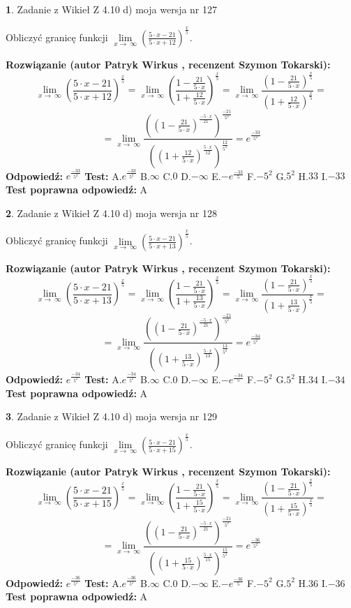 \documentclass[12pt, a4paper]{article}
\theoremstyle{definition} %
\newtheorem{zad}{}
\newcommand{\zadStart}[1]{\begin{zad}#1\newline}
\newcommand{\zadStop}{\end{zad}}
\newcommand{\rozwStart}[2]{\noindent \textbf{Rozwiązanie (autor #1 , recenzent #2): }\newline}
\newcommand{\rozwStop}{\newline}
\newcommand{\odpStart}{\noindent \textbf{Odpowiedź:}\newline}
\newcommand{\odpStop}{\newline}
\newcommand{\testStart}{\noindent \textbf{Test:}\newline}
\newcommand{\testStop}{\newline}
\newcommand{\kluczStart}{\noindent \textbf{Test poprawna odpowiedź:}\newline}
\newcommand{\kluczStop}{\newline}
\begin{document}
\zadStart{Zadanie z Wikieł Z 4.10 d) moja wersja nr 127}


Obliczyć granicę funkcji  $\lim\limits_{x\to\ \infty}(\frac{5\cdot x-21}{5\cdot x+12})^{\frac{x}{5}}$.
\zadStop
\rozwStart{Patryk Wirkus}{Szymon Tokarski}
$$\lim\limits_{x\to\ \infty}(\frac{5\cdot x-21}{5\cdot x+12})^{\frac{x}{5}} = \lim\limits_{x\to\ \infty}(\frac{1-\frac{21}{5\cdot x}}{1+\frac{12}{5\cdot x}})^{\frac{x}{5}}=\lim\limits_{x\to\ \infty}\frac{(1-\frac{21}{5\cdot x})^{\frac{x}{5}}}{(1+\frac{12}{5\cdot x})^{\frac{x}{5}}}=$$
$$=\lim\limits_{x\to\ \infty}\frac{((1-\frac{21}{5\cdot x})^{\frac{-5\cdot x}{21}})^{\frac{-21}{5^{2}}}}{((1+\frac{12}{5\cdot x})^{\frac{5\cdot x}{12}})^{\frac{12}{5^{2}}}}=e^{\frac{-33}{5^{2}}}$$
\rozwStop
\odpStart
$e^{\frac{-33}{5^{2}}}$
\odpStop
\testStart
A.$e^{\frac{-33}{5^{2}}}$ B.$\infty$ C.$0$ D.$-\infty$ E.$-e^{\frac{-33}{5}}$
F.$-5^{2}$ G.$5^{2}$
H.$33$
I.$-33$
\testStop
\kluczStart
A
\kluczStop



\zadStart{Zadanie z Wikieł Z 4.10 d) moja wersja nr 128}


Obliczyć granicę funkcji  $\lim\limits_{x\to\ \infty}(\frac{5\cdot x-21}{5\cdot x+13})^{\frac{x}{5}}$.
\zadStop
\rozwStart{Patryk Wirkus}{Szymon Tokarski}
$$\lim\limits_{x\to\ \infty}(\frac{5\cdot x-21}{5\cdot x+13})^{\frac{x}{5}} = \lim\limits_{x\to\ \infty}(\frac{1-\frac{21}{5\cdot x}}{1+\frac{13}{5\cdot x}})^{\frac{x}{5}}=\lim\limits_{x\to\ \infty}\frac{(1-\frac{21}{5\cdot x})^{\frac{x}{5}}}{(1+\frac{13}{5\cdot x})^{\frac{x}{5}}}=$$
$$=\lim\limits_{x\to\ \infty}\frac{((1-\frac{21}{5\cdot x})^{\frac{-5\cdot x}{21}})^{\frac{-21}{5^{2}}}}{((1+\frac{13}{5\cdot x})^{\frac{5\cdot x}{13}})^{\frac{13}{5^{2}}}}=e^{\frac{-34}{5^{2}}}$$
\rozwStop
\odpStart
$e^{\frac{-34}{5^{2}}}$
\odpStop
\testStart
A.$e^{\frac{-34}{5^{2}}}$ B.$\infty$ C.$0$ D.$-\infty$ E.$-e^{\frac{-34}{5}}$
F.$-5^{2}$ G.$5^{2}$
H.$34$
I.$-34$
\testStop
\kluczStart
A
\kluczStop



\zadStart{Zadanie z Wikieł Z 4.10 d) moja wersja nr 129}


Obliczyć granicę funkcji  $\lim\limits_{x\to\ \infty}(\frac{5\cdot x-21}{5\cdot x+15})^{\frac{x}{5}}$.
\zadStop
\rozwStart{Patryk Wirkus}{Szymon Tokarski}
$$\lim\limits_{x\to\ \infty}(\frac{5\cdot x-21}{5\cdot x+15})^{\frac{x}{5}} = \lim\limits_{x\to\ \infty}(\frac{1-\frac{21}{5\cdot x}}{1+\frac{15}{5\cdot x}})^{\frac{x}{5}}=\lim\limits_{x\to\ \infty}\frac{(1-\frac{21}{5\cdot x})^{\frac{x}{5}}}{(1+\frac{15}{5\cdot x})^{\frac{x}{5}}}=$$
$$=\lim\limits_{x\to\ \infty}\frac{((1-\frac{21}{5\cdot x})^{\frac{-5\cdot x}{21}})^{\frac{-21}{5^{2}}}}{((1+\frac{15}{5\cdot x})^{\frac{5\cdot x}{15}})^{\frac{15}{5^{2}}}}=e^{\frac{-36}{5^{2}}}$$
\rozwStop
\odpStart
$e^{\frac{-36}{5^{2}}}$
\odpStop
\testStart
A.$e^{\frac{-36}{5^{2}}}$ B.$\infty$ C.$0$ D.$-\infty$ E.$-e^{\frac{-36}{5}}$
F.$-5^{2}$ G.$5^{2}$
H.$36$
I.$-36$
\testStop
\kluczStart
A
\kluczStop
\end{document}
